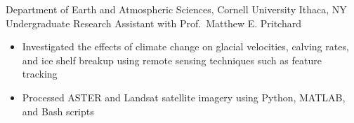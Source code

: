 
        {Department of Earth and Atmospheric Sciences, Cornell University}
        {Ithaca, NY}
        {Undergraduate Research Assistant}
        {with Prof.\ Matthew E. Pritchard}{
    \begin{itemize}
        \item Investigated the effects of climate change on glacial velocities, calving rates, and
            ice shelf breakup using remote sensing techniques such as feature tracking
        \item Processed ASTER and Landsat satellite imagery using Python, MATLAB, and Bash scripts
    \end{itemize}
}
